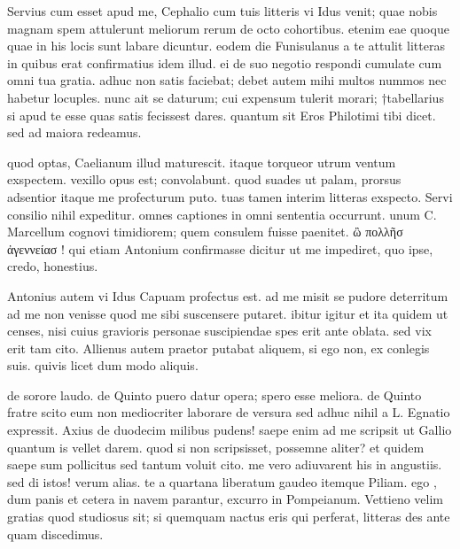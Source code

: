 


 Servius cum esset apud me, Cephalio cum tuis litteris vi Idus venit; quae nobis magnam spem attulerunt meliorum rerum de octo cohortibus. etenim eae quoque quae in his locis sunt labare dicuntur. eodem die Funisulanus a te attulit litteras in quibus erat confirmatius idem illud. ei de suo negotio respondi cumulate cum omni tua gratia. adhuc non satis faciebat; debet autem mihi multos nummos nec habetur locuples. nunc ait se daturum; cui expensum tulerit morari; †tabellarius si apud te esse quas satis fecissest dares. quantum sit Eros Philotimi tibi dicet. sed ad maiora redeamus.

 quod optas, Caelianum illud maturescit. itaque torqueor utrum ventum exspectem. vexillo opus est; convolabunt. quod suades ut palam, prorsus adsentior itaque me profecturum puto. tuas tamen interim litteras exspecto. Servi consilio nihil expeditur. omnes captiones in omni sententia occurrunt. unum C. Marcellum cognovi timidiorem; quem consulem fuisse paenitet. ὢ πολλῆσ ἀγεννείασ ! qui etiam Antonium confirmasse dicitur ut me impediret, quo ipse, credo, honestius.

 Antonius autem vi Idus Capuam profectus est. ad me misit se pudore deterritum ad me non venisse quod me sibi suscensere putaret. ibitur igitur et ita quidem ut censes, nisi cuius gravioris personae suscipiendae spes erit ante oblata. sed vix erit tam cito. Allienus autem praetor putabat aliquem, si ego non, ex conlegis suis. quivis licet dum modo aliquis.

 de sorore laudo. de Quinto puero datur opera; spero esse meliora. de Quinto fratre scito eum non mediocriter laborare de versura sed adhuc nihil a L. Egnatio expressit. Axius de duodecim milibus pudens! saepe enim ad me scripsit ut Gallio quantum is vellet darem. quod si non scripsisset, possemne aliter? et quidem saepe sum pollicitus sed tantum voluit cito. me vero adiuvarent his in angustiis. sed di istos! verum alias. te a quartana liberatum gaudeo itemque Piliam. ego , dum panis et cetera in navem parantur, excurro in Pompeianum. Vettieno velim gratias quod studiosus sit; si quemquam nactus eris qui perferat, litteras des ante quam discedimus.
